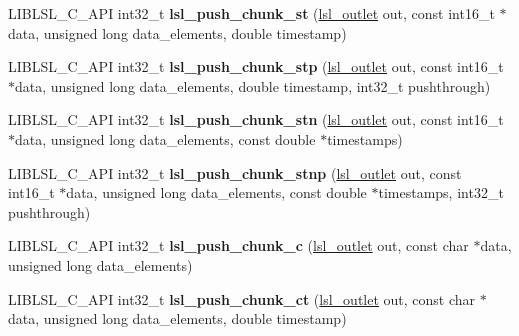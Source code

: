 \begin{DoxyCompactItemize}
\mbox{\label{namespacelsl_a6d02c87538ca2e49831fefc79a4ef751}} 
L\+I\+B\+L\+S\+L\+\_\+\+C\+\_\+\+A\+PI int32\+\_\+t {\bfseries lsl\+\_\+push\+\_\+chunk\+\_\+st} (\hyperlink{namespacelsl_abcf512b0f66dacf86c10b165995fd50b}{lsl\+\_\+outlet} out, const int16\+\_\+t $\ast$data, unsigned long data\+\_\+elements, double timestamp)
\item 
\mbox{\label{namespacelsl_a8de67854b1d0c9de42e3e69997f68d0c}} 
L\+I\+B\+L\+S\+L\+\_\+\+C\+\_\+\+A\+PI int32\+\_\+t {\bfseries lsl\+\_\+push\+\_\+chunk\+\_\+stp} (\hyperlink{namespacelsl_abcf512b0f66dacf86c10b165995fd50b}{lsl\+\_\+outlet} out, const int16\+\_\+t $\ast$data, unsigned long data\+\_\+elements, double timestamp, int32\+\_\+t pushthrough)
\item 
\mbox{\label{namespacelsl_a66784045ca9dec23b491f56474009de4}} 
L\+I\+B\+L\+S\+L\+\_\+\+C\+\_\+\+A\+PI int32\+\_\+t {\bfseries lsl\+\_\+push\+\_\+chunk\+\_\+stn} (\hyperlink{namespacelsl_abcf512b0f66dacf86c10b165995fd50b}{lsl\+\_\+outlet} out, const int16\+\_\+t $\ast$data, unsigned long data\+\_\+elements, const double $\ast$timestamps)
\item 
\mbox{\label{namespacelsl_aee4448b6c1239e14f9212700c828ca5b}} 
L\+I\+B\+L\+S\+L\+\_\+\+C\+\_\+\+A\+PI int32\+\_\+t {\bfseries lsl\+\_\+push\+\_\+chunk\+\_\+stnp} (\hyperlink{namespacelsl_abcf512b0f66dacf86c10b165995fd50b}{lsl\+\_\+outlet} out, const int16\+\_\+t $\ast$data, unsigned long data\+\_\+elements, const double $\ast$timestamps, int32\+\_\+t pushthrough)
\item 
\mbox{\label{namespacelsl_a3dd3622f5a0fcdedbc7bf4223a08ba01}} 
L\+I\+B\+L\+S\+L\+\_\+\+C\+\_\+\+A\+PI int32\+\_\+t {\bfseries lsl\+\_\+push\+\_\+chunk\+\_\+c} (\hyperlink{namespacelsl_abcf512b0f66dacf86c10b165995fd50b}{lsl\+\_\+outlet} out, const char $\ast$data, unsigned long data\+\_\+elements)
\item 
\mbox{\label{namespacelsl_a9bad246099db9f07ccc795d14709eed7}} 
L\+I\+B\+L\+S\+L\+\_\+\+C\+\_\+\+A\+PI int32\+\_\+t {\bfseries lsl\+\_\+push\+\_\+chunk\+\_\+ct} (\hyperlink{namespacelsl_abcf512b0f66dacf86c10b165995fd50b}{lsl\+\_\+outlet} out, const char $\ast$data, unsigned long data\+\_\+elements, double timestamp)
\item 

\end{DoxyCompactItemize}
